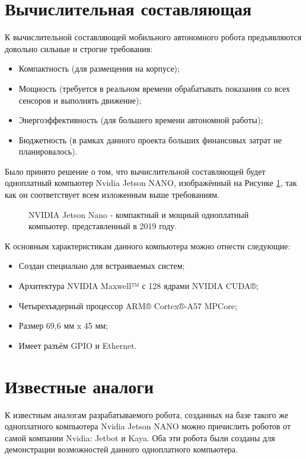 \section{Вычислительная составляющая}
К вычислительной составляющей мобильного автономного робота предъявляются довольно сильные и строгие требования:
\begin{itemize}
\item Компактность (для размещения на корпусе);
\item Мощность (требуется в реальном времени обрабатывать показания со всех сенсоров и выполнять движение);
\item Энергоэффективность (для большего времени автономной работы);
\item Бюджетность (в рамках данного проекта больших финансовых затрат не планировалось).
\end{itemize}

Было принято решение о том, что вычислительной составляющей будет одноплатный компьютер Nvidia Jetson NANO, изображённый на Рисунке \ref{fig:nvidia-jetson-nano}, так как он соответствует всем изложенным выше требованиям.

\begin{figure}[ht]
  \caption{NVIDIA Jetson Nano - компактный и мощный одноплатный компьютер, представленный в 2019 году.}\label{fig:nvidia-jetson-nano}
\end{figure}

К основным характеристикам данного компьютера можно отнести следующие\cite{jetson-nano-overview}:
\begin{itemize}
\item Создан специально для встраиваемых систем;
\item Архитектура NVIDIA Maxwell™ с 128 ядрами NVIDIA CUDA®;
\item Четырехъядерный процессор ARM® Cortex®-A57 MPCore;
\item Размер 69,6 мм x 45 мм;
\item Имеет разъём GPIO и Ethernet.
\end{itemize}

\section{Известные аналоги}
К известным аналогам разрабатываемого робота, созданных на базе такого же одноплатного компьютера Nvidia Jetson NANO можно причислить роботов от самой компании Nvidia: Jetbot и Kaya. Оба эти робота были созданы для демонстрации возможностей данного одноплатного компьютера.

